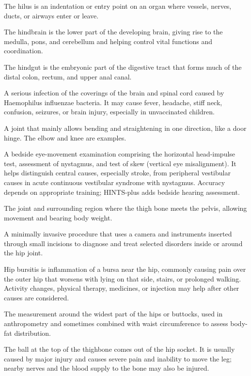  The hilus is an indentation or entry point on an organ where vessels, nerves, ducts, or airways enter or leave.

 The hindbrain is the lower part of the developing brain, giving rise to the medulla, pons, and cerebellum and helping control vital functions and coordination.

 The hindgut is the embryonic part of the digestive tract that forms much of the distal colon, rectum, and upper anal canal.

 A serious infection of the coverings of the brain and spinal cord caused by Haemophilus influenzae bacteria. It may cause fever, headache, stiff neck, confusion, seizures, or brain injury, especially in unvaccinated children.

 A joint that mainly allows bending and straightening in one direction, like a door hinge. The elbow and knee are examples.

 A bedside eye-movement examination comprising the horizontal head-impulse test, assessment of nystagmus, and test of skew (vertical eye misalignment). It helps distinguish central causes, especially stroke, from peripheral vestibular causes in acute continuous vestibular syndrome with nystagmus. Accuracy depends on appropriate training; HINTS-plus adds bedside hearing assessment.

 The joint and surrounding region where the thigh bone meets the pelvis, allowing movement and bearing body weight.

 A minimally invasive procedure that uses a camera and instruments inserted through small incisions to diagnose and treat selected disorders inside or around the hip joint.

 Hip bursitis is inflammation of a bursa near the hip, commonly causing pain over the outer hip that worsens with lying on that side, stairs, or prolonged walking. Activity changes, physical therapy, medicines, or injection may help after other causes are considered.

 The measurement around the widest part of the hips or buttocks, used in anthropometry and sometimes combined with waist circumference to assess body-fat distribution.

 The ball at the top of the thighbone comes out of the hip socket. It is usually caused by major injury and causes severe pain and inability to move the leg; nearby nerves and the blood supply to the bone may also be injured.


